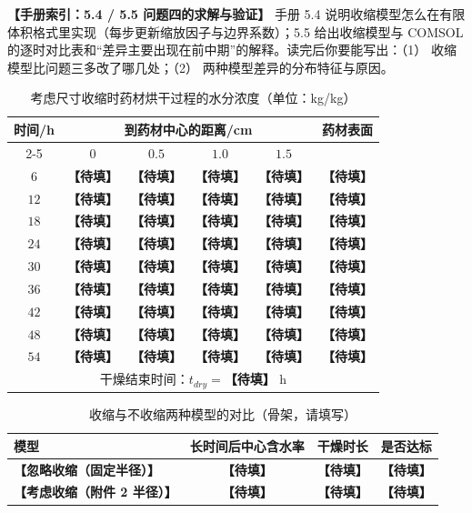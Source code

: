 \documentclass[12pt,a4paper]{article}
\newcommand{\ph}[1]{\textbf{【#1】}}                                   %
\newcommand{\handbook}[2]{\par\noindent\textbf{【手册索引：#1】} #2\par}
\begin{document}
\handbook{5.4 / 5.5 问题四的求解与验证}{手册 5.4 说明收缩模型怎么在有限体积格式里实现（每步更新缩放因子与边界系数）；5.5 给出收缩模型与 COMSOL 的逐时对比表和“差异主要出现在前中期”的解释。读完后你要能写出：（1） 收缩模型比问题三多改了哪几处；（2） 两种模型差异的分布特征与原因。}

\begin{table}[H]
\centering
\caption{考虑尺寸收缩时药材烘干过程的水分浓度（单位：kg/kg）}
\label{tab:q4-moisture}
\begin{tabular}{cccccc}
\toprule
\multirow{2}{*}{时间/h} & \multicolumn{4}{c}{到药材中心的距离/cm} & \multirow{2}{*}{药材表面}\\
\cmidrule(lr){2-5}
 & $0$ & $0.5$ & $1.0$ & $1.5$ & \\
\midrule
$6$  & \ph{待填} & \ph{待填} & \ph{待填} & \ph{待填} & \ph{待填}\\
$12$ & \ph{待填} & \ph{待填} & \ph{待填} & \ph{待填} & \ph{待填}\\
$18$ & \ph{待填} & \ph{待填} & \ph{待填} & \ph{待填} & \ph{待填}\\
$24$ & \ph{待填} & \ph{待填} & \ph{待填} & \ph{待填} & \ph{待填}\\
$30$ & \ph{待填} & \ph{待填} & \ph{待填} & \ph{待填} & \ph{待填}\\
$36$ & \ph{待填} & \ph{待填} & \ph{待填} & \ph{待填} & \ph{待填}\\
$42$ & \ph{待填} & \ph{待填} & \ph{待填} & \ph{待填} & \ph{待填}\\
$48$ & \ph{待填} & \ph{待填} & \ph{待填} & \ph{待填} & \ph{待填}\\
$54$ & \ph{待填} & \ph{待填} & \ph{待填} & \ph{待填} & \ph{待填}\\
\midrule
\multicolumn{6}{c}{干燥结束时间：$t_{dry}=$\ph{待填} h}\\
\bottomrule
\end{tabular}
\end{table}

\begin{table}[H]
\centering
\caption{收缩与不收缩两种模型的对比（骨架，请填写）}
\label{tab:q4-compare}
\begin{tabular}{p{4.6cm}ccc}
\toprule
模型 & 长时间后中心含水率 & 干燥时长 & 是否达标\\
\midrule
\ph{忽略收缩（固定半径）} & \ph{待填} & \ph{待填} & \ph{待填}\\
\ph{考虑收缩（附件 2 半径）} & \ph{待填} & \ph{待填} & \ph{待填}\\
\bottomrule
\end{tabular}
\end{table}
\end{document}
